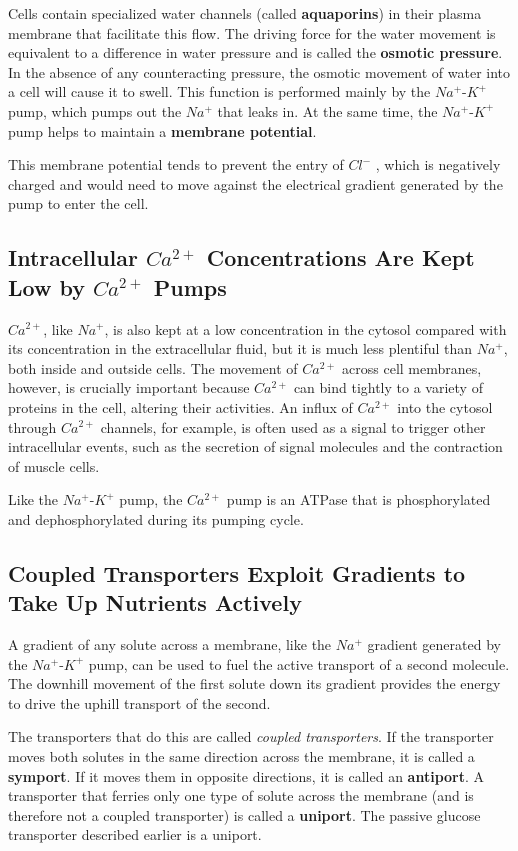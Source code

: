 Cells contain
specialized water channels (called \textbf{aquaporins}) in their plasma membrane
that facilitate this flow. The driving force for the water movement
is equivalent to a difference in water pressure and is called the \textbf{osmotic
pressure}. In the absence of any counteracting pressure, the osmotic
movement of water into a cell will cause it to swell.
This function is performed mainly by the $Na^{+}$-$K^{+}$ pump, which pumps
out the $Na^{+}$ that leaks in. At the same time, the $Na^{+}$-$K^{+}$ pump helps to
maintain a \textbf{membrane potential}. 

This membrane
potential tends to prevent the entry of $Cl^{-}$ , which is negatively charged
and would need to move against the electrical gradient generated by the
pump to enter the cell.

\subsection{Intracellular $Ca^{2+}$ Concentrations Are Kept Low by $Ca^{2+}$ Pumps}

$Ca^{2+}$, like $Na^{+}$, is also kept at a low concentration in the cytosol compared
with its concentration in the extracellular fluid, but it is much less plentiful
than $Na^{+}$, both inside and outside cells. The movement of $Ca^{2+}$ across
cell membranes, however, is crucially important because $Ca^{2+}$ can bind
tightly to a variety of proteins in the cell, altering their activities. An influx
of $Ca^{2+}$ into the cytosol through $Ca^{2+}$ channels, for example, is often used
as a signal to trigger other intracellular events, such as the secretion of
signal molecules and the contraction of muscle cells.


Like the $Na^{+}$-$K^{+}$ pump, the $Ca^{2+}$ pump is an ATPase that is phosphorylated and dephosphorylated during its pumping cycle.

\subsection{Coupled Transporters Exploit Gradients to Take Up Nutrients Actively}

A gradient of any solute across a membrane, like the $Na^{+}$ gradient generated
by the $Na^{+}$-$K^{+}$ pump, can be used to fuel the active transport of
a second molecule. The downhill movement of the first solute down its
gradient provides the energy to drive the uphill transport of the second.

The transporters that do this are called \textit{coupled transporters}.
If the transporter moves both solutes in the same direction across the membrane,
it is called a \textbf{symport}. If it moves them in opposite directions,
it is called an \textbf{antiport}. A transporter that ferries only one type of
solute across the membrane (and is therefore not a coupled transporter)
is called a \textbf{uniport}. The passive glucose transporter described earlier is a uniport.

